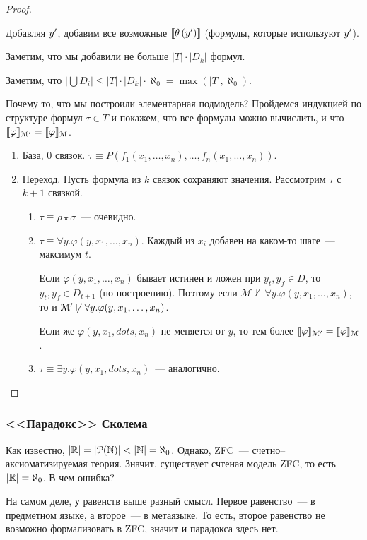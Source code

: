 \begin{proof}
\begin{enumerate}
\begin{enumerate}
            Добавляя $y^{\prime}$, добавим все возможные $\left\llbracket \theta \left( y^{\prime} \right) \right\rrbracket$ (формулы, которые используют $y^{\prime}$).
        \end{enumerate}
    \end{enumerate}
    Заметим, что мы добавили не больше $|T|\cdot |D_k|$ формул.

    Заметим, что $\left| \bigcup D_i \right| \leqslant |T| \cdot |D_k| \cdot \aleph_0 = \max\left( |T|,  \aleph_0 \right)$.

    Почему то, что мы построили элементарная подмодель? Пройдемся индукцией по структуре формул $\tau\in T$ и покажем, что все формулы можно вычислить, и что $\llbracket \varphi\rrbracket_{\mathcal{M}^{\prime}} = \llbracket \varphi\rrbracket_{\mathcal{M}}$.
    \begin{enumerate}
        \item База, 0 связок. $\tau\equiv P(f_1(x_1, \dots,x_n), \dots, f_n(x_1, \dots, x_n))$.
        \item Переход. Пусть формула из $k$ связок сохраняют значения. Рассмотрим $\tau$ с $k + 1$ связкой.
        \begin{enumerate}
            \item $\tau \equiv \rho \star \sigma$~--- очевидно.
            \item $\tau \equiv \forall y.\varphi(y, x_1, \dots, x_n)$. Каждый из $x_i$ добавен на каком-то шаге~--- максимум $t$.

            Если $\varphi(y, x_1, \dots, x_n)$ бывает истинен и ложен при $y_t, y_f \in D$, то $y_t, y_f \in D_{t+1}$ (по построению). Поэтому если $\mathcal{M} \not\vDash \forall y. \varphi(y, x_1, \dots, x_n)$, то и $\mathcal{M}^{\prime} \not\vDash \forall y. \varphi(y, x_1, \dots, x_n)$.

            Если же $\varphi(y, x_1, dots, x_n)$ не меняется от $y$, то тем более $\llbracket \varphi\rrbracket_{\mathcal M^{\prime}} = \llbracket \varphi\rrbracket_{\mathcal M}$.

            \item $\tau\equiv \exists y. \varphi(y, x_1, dots, x_n)$~--- аналогично.
        \end{enumerate}
    \end{enumerate}
\end{proof}

\subsubsection{<<Парадокс>> Сколема}
Как известно, $|\mathbb{R}| = |\mathcal P (\mathbb{N})| < |\mathbb{N}| = \aleph_0$. Однако, ZFC~--- счетно--аксиоматизируемая теория. Значит, существует счтеная модель ZFC, то есть $|\mathbb{R}| = \aleph_0$. В чем ошибка?

На самом деле, у равенств выше разный смысл. Первое равенство~--- в предметном языке, а второе~--- в метаязыке.
То есть, второе равенство не возможно формализовать в ZFC, значит и парадокса здесь нет.